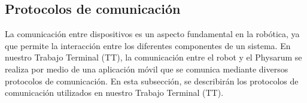 \subsection{Protocolos de comunicaci\'on} %
\label{sub:Protocolos}
    La comunicaci\'on entre dispositivos es un aspecto fundamental en la rob\'otica, ya que permite la interacci\'on entre los diferentes 
        componentes de un sistema. En nuestro Trabajo Terminal (TT), la comunicaci\'on entre el robot y el Physarum se realiza por medio de
        una aplicaci\'on m\'ovil que se comunica mediante diversos protocolos de comunicaci\'on. En esta subsecci\'on, se describir\'an
        los protocolos de comunicaci\'on utilizados en nuestro Trabajo Terminal (TT).
    \vskip 0.5cm
    
    
    
